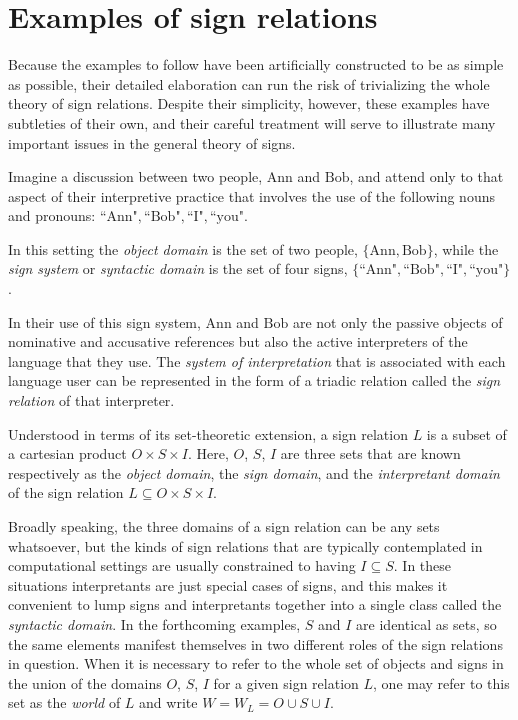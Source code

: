 \documentclass[12pt]{article}
\begin{document}
\section{Examples of sign relations}

Because the examples to follow have been artificially constructed to be as simple as possible, their detailed elaboration can run the risk of trivializing the whole theory of sign relations.  Despite their simplicity, however, these examples have subtleties of their own, and their careful treatment will serve to illustrate many important issues in the general theory of signs.

Imagine a discussion between two people, $\mathrm{Ann}$ and $\mathrm{Bob}$, and attend only to that aspect of their interpretive practice that involves the use of the following nouns and pronouns:  $\text{``Ann"}, \text{``Bob"}, \text{``I"}, \text{``you"}$.

In this setting the \textit{object domain} is the set of two people, $\{ \mathrm{Ann}, \mathrm{Bob} \}$, while the \textit{sign system} or \textit{syntactic domain} is the set of four signs, $\{ \text{``Ann"}, \text{``Bob"}, \text{``I"}, \text{``you"} \}$.

In their use of this sign system, $\mathrm{Ann}$ and $\mathrm{Bob}$ are not only the passive objects of nominative and accusative references but also the active interpreters of the language that they use.  The \textit{system of interpretation} that is associated with each language user can be represented in the form of a triadic relation called the \textit{sign relation} of that interpreter.

Understood in terms of its set-theoretic extension, a sign relation $L$ is a subset of a cartesian product $O \times S \times I$.  Here, $O$, $S$, $I$ are three sets that are known respectively as the \textit{object domain}, the \textit{sign domain}, and the \textit{interpretant domain} of the sign relation $L \subseteq O \times S \times I$.

Broadly speaking, the three domains of a sign relation can be any sets whatsoever, but the kinds of sign relations that are typically contemplated in computational settings are usually constrained to having $I \subseteq S$.  In these situations interpretants are just special cases of signs, and this makes it convenient to lump signs and interpretants together into a single class called the \textit{syntactic domain}.   In the forthcoming examples, $S$ and $I$ are identical as sets, so the same elements manifest themselves in two different roles of the sign relations in question.  When it is necessary to refer to the whole set of objects and signs in the union of the domains $O$, $S$, $I$ for a given sign relation $L$, one may refer to this set as the \textit{world} of $L$ and write $W = W_L = O \cup S \cup I$.
\end{document}
